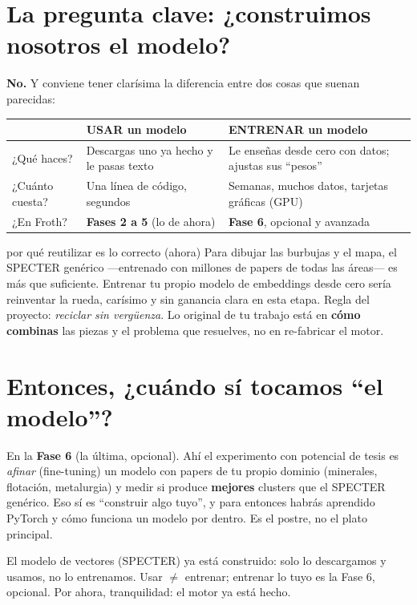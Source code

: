 \documentclass[11pt,a4paper]{article}
\begin{document}
\section{La pregunta clave: ¿construimos nosotros el modelo?}

\textbf{No.} Y conviene tener clarísima la diferencia entre dos cosas que suenan parecidas:

\begin{center}
\begin{tabular}{p{4.3cm} p{4.3cm} p{4.3cm}}
 & \textbf{USAR un modelo} & \textbf{ENTRENAR un modelo} \\[2pt]
\hline
¿Qué haces? & Descargas uno ya hecho y le pasas texto & Le enseñas desde cero con datos; ajustas sus ``pesos'' \\[6pt]
¿Cuánto cuesta? & Una línea de código, segundos & Semanas, muchos datos, tarjetas gráficas (GPU) \\[6pt]
¿En Froth? & \textbf{Fases 2 a 5} (lo de ahora) & \textbf{Fase 6}, opcional y avanzada \\
\end{tabular}
\end{center}

\begin{concepto}{por qué reutilizar es lo correcto (ahora)}
Para dibujar las burbujas y el mapa, el SPECTER genérico —entrenado con millones de papers
de todas las áreas— es más que suficiente. Entrenar tu propio modelo de embeddings desde
cero sería reinventar la rueda, carísimo y sin ganancia clara en esta etapa. Regla del
proyecto: \emph{reciclar sin vergüenza}. Lo original de tu trabajo está en \textbf{cómo
combinas} las piezas y el problema que resuelves, no en re-fabricar el motor.
\end{concepto}

\section{Entonces, ¿cuándo sí tocamos ``el modelo''?}

En la \textbf{Fase 6} (la última, opcional). Ahí el experimento con potencial de tesis es
\emph{afinar} (fine-tuning) un modelo con papers de tu propio dominio (minerales, flotación,
metalurgia) y medir si produce \textbf{mejores} clusters que el SPECTER genérico. Eso sí es
``construir algo tuyo'', y para entonces habrás aprendido PyTorch y cómo funciona un modelo
por dentro. Es el postre, no el plato principal.

\begin{resumen}
El modelo de vectores (SPECTER) ya está construido: solo lo descargamos y usamos, no lo
entrenamos. Usar $\neq$ entrenar; entrenar lo tuyo es la Fase 6, opcional. Por ahora,
tranquilidad: el motor ya está hecho.
\end{resumen}
\clearpage
{}
{}
\end{document}
